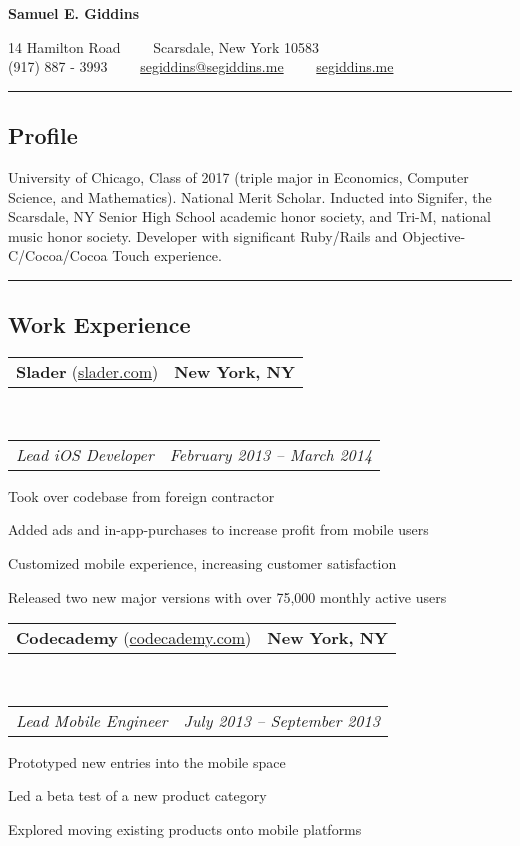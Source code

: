 \documentclass[10pt,letterpaper]{article}
\makeatletter
\newcommand{\headerrow}[2]
{\noindent \begin{tabular*}{\linewidth}{l@{\extracolsep{\fill}}r}
	#1 &
	#2 \\
\end{tabular*}}
\newcommand{\ahref}[1]
{\href{http://#1}{#1}}
\makeatother
\begin{document}
\begin{center}
{\LARGE \textbf{Samuel E. Giddins}}

14 Hamilton Road\ \ \textbullet
\ \ Scarsdale, New York 10583
\\
(917) 887 - 3993\ \ \textbullet
\ \ \href{mailto:segiddins@segiddins.me}{segiddins@segiddins.me}\ \ \textbullet
\ \ \ahref{segiddins.me}
\end{center}

\hrule
\vspace{-0.4em}
\subsection*{Profile}
University of Chicago, Class of 2017 (triple major in Economics, Computer Science, and Mathematics). National Merit Scholar. Inducted into Signifer, the Scarsdale, NY Senior High School academic honor society, and Tri-M, national music honor society. Developer with significant Ruby/Rails and Objective-C/Cocoa/Cocoa Touch experience.


\vspace{0.8em}
\hrule
\vspace{-0.4em}
\subsection*{Work Experience}


	\headerrow
		{\textbf{Slader} (\ahref{slader.com})}
		{\textbf{New York, NY}}
	\\
	\headerrow
		{\emph{Lead iOS Developer}}
		{\emph{February 2013 -- March 2014}}
	\begin{itemize*}
        
		\item Took over codebase from foreign contractor
        
		\item Added ads and in-app-purchases to increase profit from mobile users
        
		\item Customized mobile experience, increasing customer satisfaction
        
		\item Released two new major versions with over 75,000 monthly active users
        
	\end{itemize*}

	\headerrow
		{\textbf{Codecademy} (\ahref{codecademy.com})}
		{\textbf{New York, NY}}
	\\
	\headerrow
		{\emph{Lead Mobile Engineer}}
		{\emph{July 2013 -- September 2013}}
	\begin{itemize*}
        
		\item Prototyped new entries into the mobile space
        
		\item Led a beta test of a new product category
        
		\item Explored moving existing products onto mobile platforms
        
	\end{itemize*}
\end{document}
